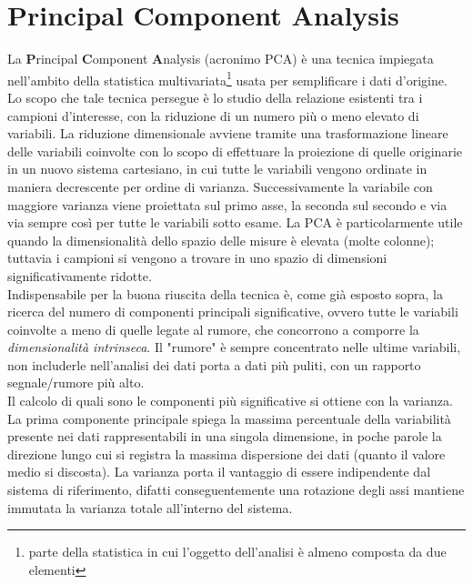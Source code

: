 \section{Principal Component Analysis}
\label{PCA}
La \textbf{P}rincipal \textbf{C}omponent \textbf{A}nalysis (acronimo PCA) \`e una tecnica impiegata nell'ambito della statistica multivariata\footnote{parte della statistica in cui l'oggetto dell'analisi \`e almeno composta da due elementi} usata per semplificare i dati d'origine.\\
Lo scopo che tale tecnica persegue \`e lo studio della relazione esistenti tra i campioni d'interesse, con la riduzione di un numero pi\`u o meno elevato di variabili. La riduzione dimensionale avviene tramite una trasformazione lineare delle variabili coinvolte con lo scopo di effettuare la proiezione di quelle originarie in un nuovo sistema cartesiano, in cui tutte le variabili vengono ordinate in maniera decrescente per ordine di varianza. Successivamente la variabile con maggiore varianza viene proiettata sul primo asse, la seconda sul secondo e via via sempre cos\`i per tutte le variabili sotto esame. La PCA \`	e particolarmente utile quando la dimensionalit\`a dello spazio delle misure \`e elevata (molte colonne); tuttavia i campioni si vengono a trovare in uno spazio di dimensioni significativamente ridotte.\\
Indispensabile per la buona riuscita della tecnica \`e, come gi\`a esposto sopra, la ricerca del numero di componenti principali significative, ovvero tutte le variabili coinvolte a meno di quelle legate al rumore, che concorrono a comporre la \textit{dimensionalit\`a intrinseca}. Il "rumore" \`e sempre concentrato nelle ultime variabili, non includerle nell'analisi dei dati porta a dati pi\`u puliti, con un rapporto segnale/rumore pi\`u alto.\\
Il calcolo di quali sono le componenti pi\`u significative si ottiene con la varianza. La prima componente principale spiega la massima percentuale della variabilit\`a presente nei dati rappresentabili in una singola dimensione, in poche parole la direzione lungo cui si registra la massima dispersione dei dati (quanto il valore medio si discosta). La varianza porta il vantaggio di essere indipendente dal sistema di riferimento, difatti conseguentemente una rotazione degli assi mantiene immutata la varianza totale all'interno del sistema.

